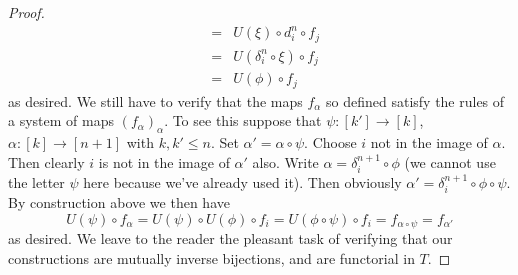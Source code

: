 \documentclass{stacks-project}
\theoremstyle{plain}
\theoremstyle{definition}
\theoremstyle{remark}
\numberwithin{equation}{subsection}
\begin{document}
\begin{proof}
\begin{eqnarray*}
& = & U(\xi) \circ d^n_i \circ f_j \\
& = & U(\delta^n_i \circ \xi) \circ f_j \\
& = & U(\phi) \circ f_j
\end{eqnarray*}
as desired. We still have to verify that the maps
$f_\alpha$ so defined satisfy the rules of a system
of maps $(f_\alpha)_\alpha$. To see this suppose that
$\psi : [k'] \to [k]$, $\alpha : [k] \to [n + 1]$ with
$k, k' \leq n$. Set $\alpha' = \alpha \circ \psi$.
Choose $i$ not in the image of $\alpha$. Then clearly
$i$ is not in the image of $\alpha'$ also. Write
$\alpha = \delta^{n + 1}_i \circ \phi$ (we cannot use the letter $\psi$ here
because we've already used it). Then obviously
$\alpha' = \delta^{n + 1}_i \circ \phi \circ \psi$. By construction above
we then have
$$
U(\psi) \circ f_\alpha = U(\psi) \circ U(\phi) \circ f_i
= U(\phi \circ \psi) \circ f_i = f_{\alpha \circ \psi} = f_{\alpha'}
$$
as desired. We leave to the reader the pleasant task of verifying
that our constructions are mutually inverse bijections, and are
functorial in $T$.
\end{proof}
\end{document}
